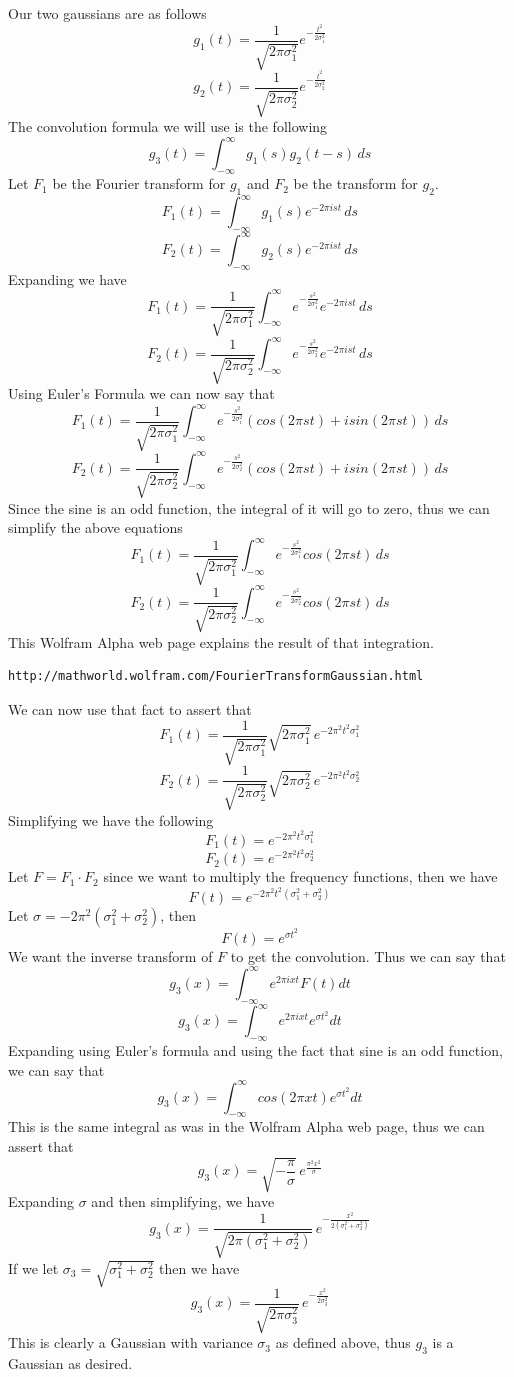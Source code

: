 \documentclass[11pt,psfig]{article}
\begin{document}
Our two gaussians are as follows
\[
g_1(t) = \frac{1}{\sqrt{2\pi \sigma_1^2}} e^{-\frac{t^2}{2\sigma_1^2}}
\]
\[
g_2(t) = \frac{1}{\sqrt{2\pi \sigma_2^2}} e^{-\frac{t^2}{2\sigma_2^2}}
\]
The convolution formula we will use is the following
\[
g_3(t) = \int_{-\infty}^{\infty}{g_1(s)g_2(t-s) \, ds}
\]
Let $F_1$ be the Fourier transform for $g_1$ and $F_2$ be the transform for $g_2$.\\
\[
F_1(t) = \int_{-\infty}^{\infty}{g_1(s) e^{-2\pi i s t} \, ds}
\]
\[
F_2(t) = \int_{-\infty}^{\infty}{g_2(s) e^{-2\pi i s t} \, ds}
\]
Expanding we have
\[
F_1(t) = \frac{1}{\sqrt{2 \pi \sigma_1^2}} \int_{-\infty}^{\infty}{e^{-\frac{s^2}{2\sigma_1^2}} e^{-2\pi i s t} \, ds}
\]
\[
F_2(t) = \frac{1}{\sqrt{2 \pi \sigma_2^2}} \int_{-\infty}^{\infty}{e^{-\frac{s^2}{2\sigma_2^2}} e^{-2\pi i s t} \, ds}
\]
Using Euler's Formula we can now say that
\[
F_1(t) = \frac{1}{\sqrt{2 \pi \sigma_1^2}} \int_{-\infty}^{\infty}{e^{-\frac{s^2}{2\sigma_1^2}} (cos(2\pi s t) + i sin(2\pi s t)) \, ds}
\]
\[
F_2(t) = \frac{1}{\sqrt{2 \pi \sigma_2^2}} \int_{-\infty}^{\infty}{e^{-\frac{s^2}{2\sigma_2^2}} (cos(2\pi s t) + i sin(2\pi s t)) \, ds}
\]
Since the sine is an odd function, the integral of it will go to zero, thus we can simplify the above equations
\[
F_1(t) = \frac{1}{\sqrt{2 \pi \sigma_1^2}} \int_{-\infty}^{\infty}{e^{-\frac{s^2}{2\sigma_1^2}} cos(2\pi s t) \, ds}
\]
\[
F_2(t) = \frac{1}{\sqrt{2 \pi \sigma_2^2}} \int_{-\infty}^{\infty}{e^{-\frac{s^2}{2\sigma_2^2}} cos(2\pi s t) \, ds}
\]
This Wolfram Alpha web page explains the result of that integration. 
\begin{verbatim}
http://mathworld.wolfram.com/FourierTransformGaussian.html
\end{verbatim}
We can now use that fact to assert that
\[
F_1(t) = \frac{1}{\sqrt{2 \pi \sigma_1^2}} \sqrt{2 \pi \sigma_1^2} \, e^{-2 \pi^2 t^2 \sigma_1^2}
\]
\[
F_2(t) = \frac{1}{\sqrt{2 \pi \sigma_2^2}} \sqrt{2 \pi \sigma_2^2} \, e^{-2 \pi^2 t^2 \sigma_2^2}
\]
Simplifying we have the following
\[
F_1(t) = e^{-2 \pi^2 t^2 \sigma_1^2}
\]
\[
F_2(t) = e^{-2 \pi^2 t^2 \sigma_2^2}
\]
Let $F=F_1 \cdot F_2$ since we want to multiply the frequency functions, then we have
\[
F(t) = e^{-2 \pi^2 t^2 (\sigma_1^2 + \sigma_2^2)}
\]
Let $\sigma = -2 \pi^2 (\sigma_1^2 + \sigma_2^2)$, then 
\[
F(t) = e^{\sigma t^2}
\]
We want the inverse transform of $F$ to get the convolution. Thus we can say that 
\[
g_3(x) = \int_{-\infty}^{\infty} e^{2\pi i x t} F(t) dt
\]
\[
g_3(x) = \int_{-\infty}^{\infty} e^{2\pi i x t}e^{\sigma t^2} dt
\]
Expanding using Euler's formula and using the fact that sine is an odd function, we can say that
\[
g_3(x) = \int_{-\infty}^{\infty} cos(2 \pi x t)e^{\sigma t^2} dt
\]
This is the same integral as was in the Wolfram Alpha web page, thus we can assert that
\[
g_3(x) = \sqrt{-\frac{\pi}{\sigma}} \, e^{\frac{\pi^2 x^2}{\sigma}}
\]
Expanding $\sigma$ and then simplifying, we have
\[
g_3(x) = \frac{1}{\sqrt{2\pi (\sigma_1^2 + \sigma_2^2)}} \, e^{-\frac{x^2}{2(\sigma_1^2 + \sigma_2^2)}}
\]
If we let $\sigma_3 = \sqrt{\sigma_1^2 + \sigma_2^2}$ then we have
\[
g_3(x) = \frac{1}{\sqrt{2\pi \sigma_3^2}} \, e^{-\frac{x^2}{2\sigma_3^2}}
\]
This is clearly a Gaussian with variance $\sigma_3$ as defined above, thus $g_3$ is a Gaussian as desired. 
\end{document}
